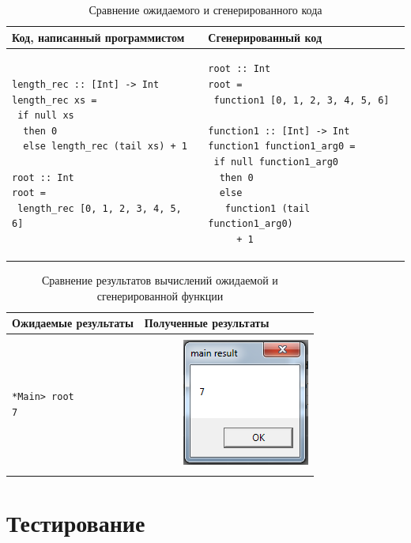 \begin{table}[h]
\centering
\begin{tabular}{|l|l|}
\hline
Код, написанный программистом &
Сгенерированный код \\
\hline
\begin{lstlisting}
length_rec :: [Int] -> Int
length_rec xs = 
 if null xs
  then 0
  else length_rec (tail xs) + 1

root :: Int
root = 
 length_rec [0, 1, 2, 3, 4, 5, 6]
\end{lstlisting} &
\begin{lstlisting}
root :: Int
root = 
 function1 [0, 1, 2, 3, 4, 5, 6]

function1 :: [Int] -> Int
function1 function1_arg0 = 
 if null function1_arg0
  then 0
  else 
   function1 (tail function1_arg0)
     + 1
\end{lstlisting} \\
\hline
\end{tabular}
\caption{Сравнение ожидаемого и сгенерированного кода}\label{expectreal}
\end{table}

\begin{table}[h]
\centering
\begin{tabular}{|l|l|}
\hline
Ожидаемые результаты & Полученные результаты \\
\hline
 & \\
\begin{minipage}{2in}
	\begin{verbatim}
*Main> root
7
	\end{verbatim}
\end{minipage} &
~~~~~~~\includegraphics{img/result.PNG} \\
 & \\
\hline
\end{tabular}
\caption{Сравнение результатов вычислений ожидаемой и сгенерированной функции}\label{exprealres}
\end{table}

\chapter{Тестирование}
